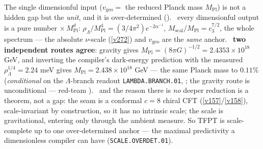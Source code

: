 \documentclass[11pt,a4paper]{article}
\newcommand{\cthree}{c_3}
\newcommand{\Mpl}{M_{\mathrm{Pl}}}
\begin{document}
\begin{keybox}
The single dimensionful input ($v_{\mathrm{geo}}=$ the reduced Planck mass $\Mpl$) is not a hidden gap but the
\emph{unit}, and it is over-determined (). \mE\ every dimensionful output
is a pure number $\times\,\Mpl^d$: $\rho_\Lambda/\Mpl^4=(3/4\pi^2)e^{-2\alpha^{-1}}$, $M_{\mathrm{scal}}/\Mpl
=\cthree^{7/2}$, the whole spectrum --- the absolute $\nu$-scale (\vref{v272}) and $v_{\mathrm{geo}}$ are the
\emph{same} anchor. \mC\ \textbf{two independent routes agree}: gravity gives $\Mpl=(8\pi G)^{-1/2}
=2.4353{\times}10^{18}$ GeV, and inverting the compiler's dark-energy prediction with the measured
$\rho_\Lambda^{1/4}=2.24$ meV gives $\Mpl=2.438{\times}10^{18}$ GeV --- the same Planck mass to $0.11\%$
(\emph{conditional} on the $\Lambda$-branch readout \texttt{LAMBDA.BRANCH.01}, \mC; the gravity route is
unconditional --- red-team ). \mE\ and
the reason there is \emph{no} deeper reduction is a theorem, not a gap: the seam is a conformal $c{=}8$ chiral CFT
(\vref{v157}/\vref{v158}), scale-invariant by construction, so it has no intrinsic scale; the scale is
gravitational, entering only through the ambient measure. So TFPT is scale-complete up to one over-determined
anchor --- the maximal predictivity a dimensionless compiler can have (\texttt{SCALE.OVERDET.01}).
\end{keybox}

\end{document}
